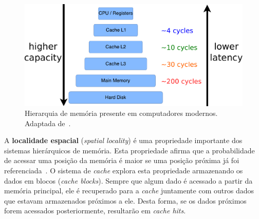 \begin{figure}[ht]
    \centering
    \includegraphics[width=0.7\linewidth]{img/tecnica/memoryHierarchy}
    \caption[Hierarquia de memória]{Hierarquia de memória presente em computadores modernos. Adaptada de~.}
    \label{fig:memoryHierarchy}
\end{figure}

A \textbf{localidade espacial} (\textit{spatial locality}) é uma propriedade importante dos sistemas hierárquicos de memória. Esta propriedade afirma que a probabilidade de acessar uma posição da memória é maior se uma posição próxima já foi referenciada~\cite{patterson2013computer}. O sistema de \textit{cache} explora esta propriedade armazenando os dados em blocos (\textit{cache blocks}). Sempre que algum dado é acessado a partir da memória principal, ele é recuperado para a \textit{cache} juntamente com outros dados que estavam armazenados próximos a ele. Desta forma, se os dados próximos forem acessados posteriormente, resultarão em \textit{cache hits}.







